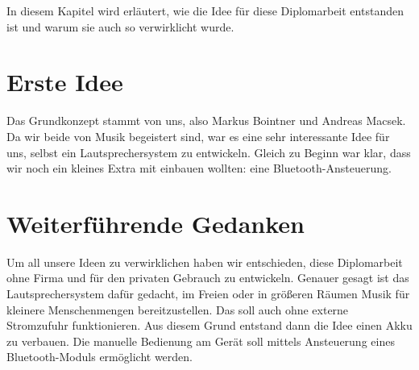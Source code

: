 In diesem Kapitel wird erläutert, wie die Idee für diese Diplomarbeit entstanden ist und warum sie auch so verwirklicht wurde.

\section{Erste Idee} \label{sec:1.1}
Das Grundkonzept stammt von uns, also Markus Bointner und Andreas Macsek. Da wir beide von Musik begeistert sind, war es eine sehr interessante Idee für uns, selbst ein Lautsprechersystem zu entwickeln. Gleich zu Beginn war klar, dass wir noch ein kleines Extra mit einbauen wollten: eine Bluetooth-Ansteuerung.

\section{Weiterführende Gedanken} \label{sec:1.2}
Um all unsere Ideen zu verwirklichen haben wir entschieden, diese Diplomarbeit ohne Firma und für den privaten Gebrauch zu entwickeln. Genauer gesagt ist das Lautsprechersystem dafür gedacht, im Freien oder in größeren Räumen Musik für kleinere Menschenmengen bereitzustellen. Das soll auch ohne externe Stromzufuhr funktionieren. Aus diesem Grund entstand dann die Idee einen Akku zu verbauen. Die manuelle Bedienung am Gerät soll mittels Ansteuerung eines Bluetooth-Moduls ermöglicht werden.
